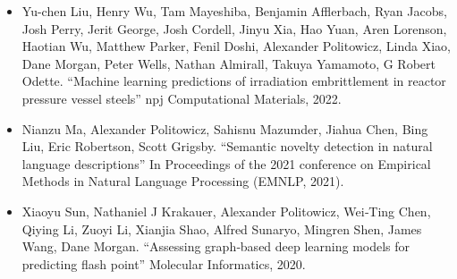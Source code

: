 \begin{singlespace}
\begin{description}[labelwidth=4cm,leftmargin=4.2cm,itemsep=1em]
\begin{itemize}[label={},listparindent=0pt,itemindent=0pt,leftmargin=0pt,itemsep=1em,parsep=0pt,topsep=0pt,partopsep=0pt]
                \item Yu-chen Liu, Henry Wu, Tam Mayeshiba, Benjamin Afflerbach, Ryan Jacobs, Josh Perry, Jerit George, Josh Cordell, Jinyu Xia, Hao Yuan, Aren Lorenson, Haotian Wu, Matthew Parker, Fenil Doshi, Alexander Politowicz, Linda Xiao, Dane Morgan, Peter Wells, Nathan Almirall, Takuya Yamamoto, G Robert Odette.
                ``Machine learning predictions of irradiation embrittlement in reactor pressure vessel steels''
                npj Computational Materials, 2022.

                \item Nianzu Ma, Alexander Politowicz, Sahisnu Mazumder, Jiahua Chen, Bing Liu, Eric Robertson, Scott Grigsby.
                ``Semantic novelty detection in natural language descriptions''
                In Proceedings of the 2021 conference on Empirical Methods in Natural Language Processing (EMNLP, 2021).

                \item Xiaoyu Sun, Nathaniel J Krakauer, Alexander Politowicz, Wei‐Ting Chen, Qiying Li, Zuoyi Li, Xianjia Shao, Alfred Sunaryo, Mingren Shen, James Wang, Dane Morgan.
                ``Assessing graph‐based deep learning models for predicting flash point''
                Molecular Informatics, 2020.

            \end{itemize}
    \end{description}
\end{singlespace}